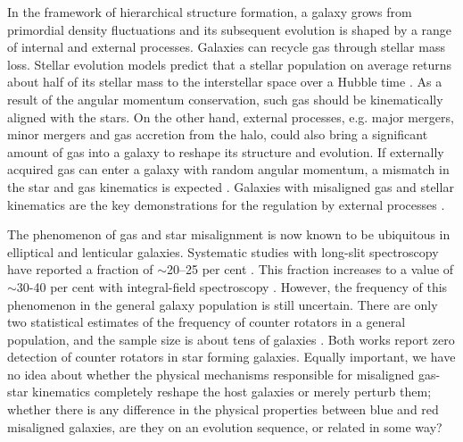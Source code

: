 \documentclass[a4paper,fleqn,usenatbib]{mnras}
\begin{document}
In the framework  of hierarchical structure formation,  a galaxy grows
from primordial  density fluctuations and its  subsequent evolution is
shaped by  a range of  internal and external processes.   Galaxies can
recycle  gas  through stellar  mass  loss.   Stellar evolution  models
predict that a stellar population on average returns about half of its
stellar  mass   to  the   interstellar  space   over  a   Hubble  time
\citep{Jungwiert01,  Lia02, Pozzetti07}.   As a  result of  the angular
momentum conservation,  such gas should be  kinematically aligned with
the stars.  On the other hand, external processes, e.g. major mergers,
minor mergers  and gas  accretion from  the halo,  could also  bring a
significant amount of  gas into a galaxy to reshape  its structure and
evolution.  If externally acquired gas  can enter a galaxy with 
random angular  momentum, a mismatch in  the  star and  gas kinematics  is
expected \citep{bertola-1992a, bureau-2006, corsini-2014}. 
Galaxies  with misaligned gas and  stellar kinematics  are  the key
demonstrations    for   the    regulation   by    external   processes
\citep{rubin1994, Schweizer98}.

The phenomenon  of gas and  star misalignment  is now known  to be
ubiquitous  in elliptical  and lenticular  galaxies. Systematic    studies   with   long-slit
spectroscopy   have   reported   a    fraction   of $\sim$20--25 per cent
\citep{bertola-1992a, Kuijken96, kannappan-2001}. This fraction increases to a value
of $\sim$30-40 per cent with integral-field  spectroscopy  \citep{Sarzi06,  davis-2011,  barrera-2014,  barrera-2015}. 
However, the frequency of this phenomenon in the general galaxy 
population is still uncertain. There are only two statistical estimates 
of the frequency of counter rotators in a general population, and the sample 
size is about tens of galaxies \citep{kannappan-2001, pizzella-2004}. Both works 
report zero detection of counter rotators in star forming galaxies. Equally important, 
we have no idea about whether the physical mechanisms responsible for misaligned gas-star kinematics
completely reshape the host galaxies or merely perturb them; whether there is any 
difference in the physical properties between blue and red misaligned galaxies, are they 
on an evolution sequence, or related in some way?
\end{document}
